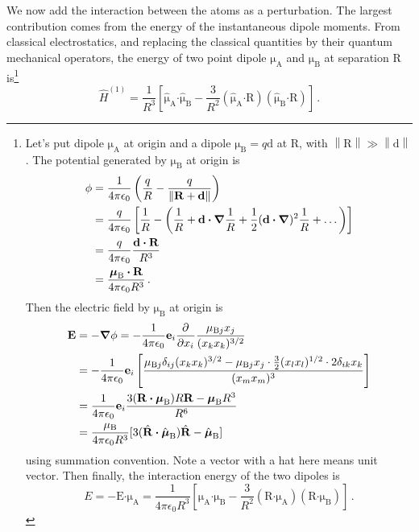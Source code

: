 \documentclass{article}
\theoremstyle{plain}\theoremheaderfont{\normalfont\itshape}\theorembodyfont{\rmfamily}\theoremseparator{.}\newtheorem*{rem}{Remark}\newtheorem*{ex}{Example}\newtheorem*{proof}{Proof}\newtheorem*{altp}{Alternative proof}
\theoremstyle{plain}\theoremheaderfont{\normalfont\bfseries}\theorembodyfont{\rmfamily}\theoremseparator{.}\newtheorem{thm}{Theorem}[section]\newtheorem{lem}[thm]{Lemma}\newtheorem{prop}[thm]{Proposition}\newtheorem*{cor}{Corollary}\newtheorem{defn}[thm]{Definition}\newtheorem{clm}[thm]{Claim}\newtheorem{clminproof}{Claim}
\theoremstyle{break}\theoremheaderfont{\normalfont\itshape}\theorembodyfont{\rmfamily}\theoremseparator{.\medskip}\newtheorem*{proofskip}{Proof}\newtheorem*{exs}{Examples}\newtheorem*{rems}{Remarks}
\theoremstyle{break}\theoremheaderfont{\normalfont\bfseries}\theorembodyfont{\rmfamily}\theoremseparator{.\medskip}\newtheorem{lemskip}[thm]{Lemma}\newtheorem{defnskip}[thm]{Definition}\newtheorem{propskip}[thm]{Proposition}\newtheorem{thmskip}[thm]{Theorem}
\numberwithin{equation}{section}
\newcommand{\pdv}[3][]{\frac{\partial^{#1} #2}{{\partial #3}^{#1}}}
\newcommand{\vb}[1]{\bm{\mathrm{#1}}}
\newcommand{\vu}[1]{\hat{\bm{\mathrm{#1}}}}
\newcommand{\vdot}{\bm{\cdot}}
\newcommand{\norm}[1]{\left\| #1 \right\|}
\newcommand{\grad}{\vb{\nabla}}
\renewcommand{\AA}{\mathrm{A}}
\newcommand{\BB}{\mathrm{B}}
\begin{document}
    We now add the interaction between the atoms as a perturbation. The largest contribution comes from the energy of the instantaneous dipole moments. From classical electrostatics, and replacing the classical quantities by their quantum mechanical operators, the energy of two point dipole \(\vb{\mu}_{\AA}\) and \(\vb{\mu}_{\BB}\) at separation \(\vb{R}\) is\footnote{Let's put dipole \(\vb{\mu}_{\AA}\) at origin and a dipole \(\vb{\mu}_{\BB}=q\vb{d}\) at \(\vb{R}\), with \(\norm{\vb{R}}\gg\norm{\vb{d}}\). The potential generated by \(\vb{\mu}_{\BB}\) at origin is
    \begin{align}
        \phi&=\frac{1}{4\pi\epsilon_0}\left(\frac{q}{R}-\frac{q}{\norm{\vb{R}+\vb{d}}}\right)\notag\\
        &=\frac{q}{4\pi\epsilon_0}\left[\frac{1}{R}-\left(\frac{1}{R}+\vb{d}\vdot\grad\frac{1}{R}+\frac{1}{2}(\vb{d}\vdot\grad)^2\frac{1}{R}+\dots\right)\right]\notag\\
        &=\frac{q}{4\pi\epsilon_0}\frac{\vb{d}\vdot\vb{R}}{R^3}\notag\\
        &=\frac{\vb{\mu}_{\BB}\vdot\vb{R}}{4\pi\epsilon_0 R^3}\,.
    \end{align}
    Then the electric field by \(\vb{\mu}_{\BB}\) at origin is
    \begin{align}
        \vb{E}&=-\grad\phi=-\frac{1}{4\pi\epsilon_0}\vb{e}_i\pdv{}{x_i}\frac{\mu_{\BB j}x_j}{(x_k x_k)^{3/2}}\notag \\
        &=-\frac{1}{4\pi\epsilon_0}\vb{e}_i\left[\frac{\mu_{\BB j}\delta_{ij}(x_kx_k)^{3/2}-\mu_{\BB j}x_j\cdot\frac{3}{2}(x_l x_l)^{1/2}\cdot 2\delta_{ik}x_k}{(x_m x_m)^{3}}\right]\notag \\
        &=\frac{1}{4\pi\epsilon_0}\vb{e}_i\frac{3(\vb{R}\vdot\vb{\mu}_{\BB})R\vb{R}-\vb{\mu}_{\BB}R^3}{R^6}\notag\\
        &=\frac{\mu_{\BB}}{4\pi\epsilon_0 R^3}[3(\vu{R}\vdot\vu{\mu}_{\BB})\vu{R}-\vu{\mu}_{\BB}]
    \end{align}
    using summation convention. Note a vector with a hat here means unit vector. Then finally, the interaction energy of the two dipoles is
    \begin{equation}
        E=-\vb{E}\vdot\vb{\mu}_{\AA}=\frac{1}{4\pi\epsilon_0 R^3}\left[\vb{\mu}_{\AA}\vdot\vb{\mu}_{\BB}-\frac{3}{R^2}(\vb{R}\vdot\vb{\mu}_{\AA})(\vb{R}\vdot\vb{\mu}_{\BB})\right]\,.
    \end{equation}}
    \begin{equation}
        \hat{H}^{(1)}=\frac{1}{R^3}\left[\hat{\vb{\mu}}_{\AA}\vdot\hat{\vb{\mu}}_{\BB}-\frac{3}{R^2}(\hat{\vb{\mu}}_{\AA}\vdot\vb{R})(\hat{\vb{\mu}}_{\BB}\vdot\vb{R})\right]\,.
    \end{equation}
\end{document}
